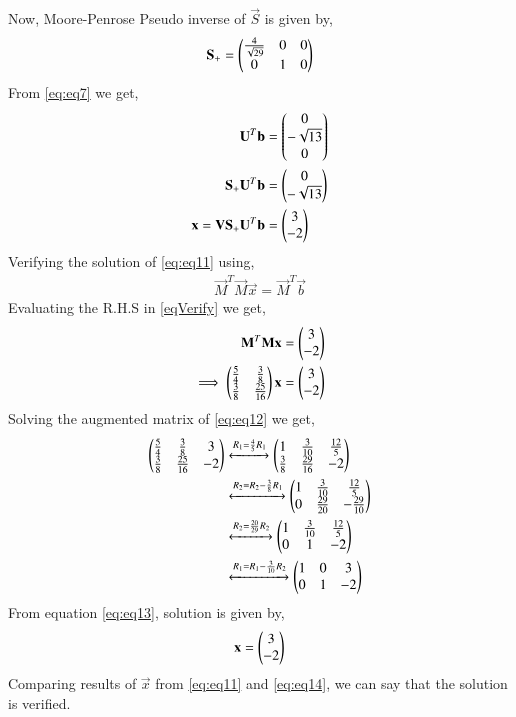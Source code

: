 \documentclass[journal,12pt,twocolumn]{IEEEtran}
\begin{document}
Now, Moore-Penrose Pseudo inverse of $\vec{S}$ is given by,
\begin{align}
\mathbf{S_+} = \begin{pmatrix}\frac{4}{\sqrt{29}}&0&0\\0&1&0\end{pmatrix}
\end{align}
From \eqref{eq:eq7} we get,
\begin{align}
\mathbf{U}^T\mathbf{b}&=\begin{pmatrix}0\\-\sqrt{13}\\0\end{pmatrix}\\
\mathbf{S_+}\mathbf{U}^T\mathbf{b}&=\begin{pmatrix}0\\-\sqrt{13}\end{pmatrix}\\
\mathbf{x} = \mathbf{V}\mathbf{S_+}\mathbf{U}^T\mathbf{b} &= \begin{pmatrix}3\\-2\end{pmatrix} \label{eq:eq11}
\end{align}
Verifying the solution of \eqref{eq:eq11} using,
\begin{align}
\vec{M}^T\vec{M}\vec{x} = \vec{M}^T\vec{b}\label{eqVerify}
\end{align}
Evaluating the R.H.S in \eqref{eqVerify} we get,
\begin{align}
\mathbf{M}^T\mathbf{M}\mathbf{x} &= \begin{pmatrix}3\\-2\end{pmatrix}\\
\implies\begin{pmatrix}\frac{5}{4}&\frac{3}{8}\\\frac{3}{8}&\frac{25}{16}\end{pmatrix}\mathbf{x} &= \begin{pmatrix}3\\-2\end{pmatrix}\label{eq:eq12}
\end{align}
Solving the augmented matrix of \eqref{eq:eq12} we get,
\begin{align}
\begin{pmatrix}\frac{5}{4}&\frac{3}{8}&3\\\frac{3}{8}&\frac{25}{16}&-2\end{pmatrix} &\xleftrightarrow{R_1=\frac{4}{5}R_1}\begin{pmatrix}1&\frac{3}{10}&\frac{12}{5}\\\frac{3}{8}&\frac{29}{16}&-2\end{pmatrix}\\
&\xleftrightarrow{R_2=R_2-\frac{3}{8}R_1}\begin{pmatrix}1&\frac{3}{10}&\frac{12}{5}\\0&\frac{29}{20}&-\frac{29}{10}\end{pmatrix}\\
&\xleftrightarrow{R_2=\frac{20}{29}R_2}\begin{pmatrix}1&\frac{3}{10}&\frac{12}{5}\\0&1&-2\end{pmatrix}\\
&\xleftrightarrow{R_1=R_1-\frac{3}{10}R_2}\begin{pmatrix}1&0&3\\0&1&-2\end{pmatrix}\label{eq:eq13}
\end{align}
From equation \eqref{eq:eq13}, solution is given by,
\begin{align}
\mathbf{x}=\begin{pmatrix}3\\-2\end{pmatrix}\label{eq:eq14}
\end{align}
Comparing results of $\vec{x}$ from \eqref{eq:eq11} and \eqref{eq:eq14}, we can say that the solution is verified.
\end{document}
